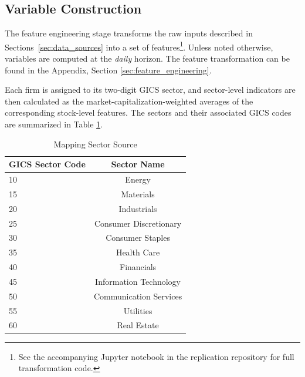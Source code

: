 \subsection{Variable Construction}\label{sec:var_construct}
The feature engineering stage transforms the raw inputs described in Sections~\ref{sec:data_sources} into a set of features\footnote{See the accompanying Jupyter notebook in the replication repository for full transformation code.}. Unless noted otherwise, variables are computed at the \emph{daily} horizon. The feature transformation can be found in the Appendix, Section \ref{sec:feature_engineering}.


Each firm is assigned to its two-digit GICS sector, and sector-level indicators are then calculated as the market-capitalization-weighted averages of the corresponding stock-level features.  The sectors and their associated GICS codes are summarized in Table \ref{tab:sectors_mapp}.  

\begin{table}[htbp]
     \centering
     \caption{Mapping Sector Source}
     \label{tab:sectors_mapp}
     \begin{threeparttable}             %
         \begin{tabular}{@{}l c@{}}
             \toprule
             \textbf{GICS Sector Code} & \textbf{Sector Name}\\
             \midrule
             10 & Energy\\
             15 & Materials\\
             20 & Industrials\\
             25 & Consumer Discretionary\\
             30 & Consumer Staples\\
             35 & Health Care\\
             40 & Financials\\
             45 & Information Technology\\
             50 & Communication Services\\
             55 & Utilities\\
             60 & Real Estate\\
             \bottomrule
         \end{tabular}
 
     \end{threeparttable}               %
 \end{table}

